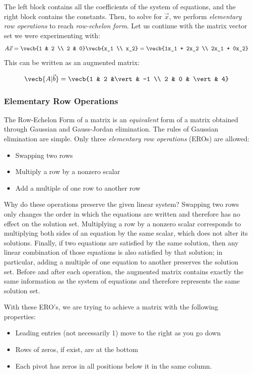 The left block contains all the coefficients of the system of equations, and the right block contains the constants. Then, to solve for $\vec{x}$, we perform \textit{elementary row operations} to reach \textit{row-echelon form}. Let us continue with the matrix vector set we were experimenting with:
$$A\vec{x} = \vecb{1 & 2 \\ 2 & 0}\vecb{x_1 \\ x_2} = \vecb{1x_1 + 2x_2 \\ 2x_1 + 0x_2}$$
This can be written as an augmented matrix:

$$\vecb{A\vert \vec{b}} = \vecb{1 & 2 &\vert & -1 \\ 2 & 0 & \vert & 4}$$


\subsubsection{Elementary Row Operations}
The Row-Echelon Form of a matrix is an \emph{equivalent} form of a matrix obtained through Gaussian and Gauss-Jordan elimination. The rules of Gaussian elimination are simple. Only three \emph{elementary row operations} (EROs) are allowed:

\begin{itemize}
       \item Swapping two rows
       \item Multiply a row by a nonzero scalar
       \item Add a multiple of one row to another row
\end{itemize}
Why do these operations preserve the given linear system? Swapping two rows only changes the order in which the equations are written and therefore has no effect on the solution set. Multiplying a row by a nonzero scalar corresponds to multiplying both sides of an equation by the same scalar, which does not alter its solutions. Finally, if two equations are satisfied by the same solution, then any linear combination of those equations is also satisfied by that solution; in particular, adding a multiple of one equation to another preserves the solution set. Before and after each operation, the augmented matrix contains exactly the same information as the system of equations and therefore represents the same solution set.

With these ERO's, we are trying to achieve a matrix with the following properties:
\begin{itemize}
\item Leading entries (not necessarily 1) move to the right as you go down
\item Rows of zeros, if exist, are at the bottom
\item Each pivot has zeros in all positions below it in the same column.
\end{itemize}

